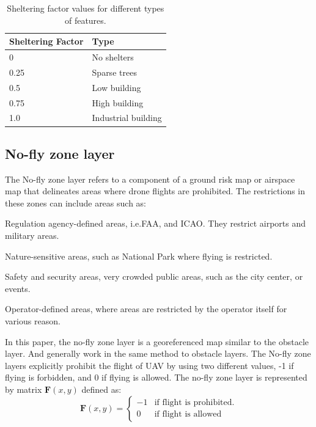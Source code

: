 \documentclass[12pt]{report}
\begin{document}
             \begin{table}[H]
                 \centering
                 \caption{Sheltering factor values for different types of features.}
                 \label{tab:sheltering_factor}
                 \begin{tabular}{|p{4cm}|p{4cm}|}
                     \hline
                     Sheltering Factor & Type \\
                     \hline
                     0 & No shelters \\
                     \hline
                     0.25 & Sparse trees \\
                     \hline
                     0.5 & Low building \\
                     \hline
                     0.75 & High building \\
                     \hline
                     1.0 & Industrial building \\
                     \hline
                 \end{tabular}
             \end{table}

        \subsection{No-fly zone layer}
            The No-fly zone layer refers to a component of a ground risk map or airspace map that delineates areas where
            drone flights are prohibited. The restrictions in these zones can include areas such as:
            \begin{myitemize}
                \item Regulation agency-defined areas, i.e.\ac{FAA}, and \ac{ICAO}. They restrict airports and military areas.
                \item Nature-sensitive areas, such as National Park where flying is restricted.
                \item Safety and security areas, very crowded public areas, such as the city center, or events.
                \item Operator-defined areas, where areas are restricted by the operator itself for various reason. 
            \end{myitemize}

            In this paper, the no-fly zone layer is a georeferenced map similar to the obstacle layer. And generally
            work in the same method to obstacle layers. The No-fly zone layers explicitly prohibit the flight of UAV by
            using two different values, -1 if flying is forbidden, and 0 if flying is allowed. The no-fly zone layer is
            represented by matrix \(\mathbf{F}(x, y)\) defined as:
            \begin{equation}
                \mathbf{F}(x, y) = 
                \begin{cases}    
                    -1 & \text{if flight is prohibited.} \\
                    0 & \text{if flight is allowed}
                \end{cases}
            \end{equation}
\end{document}
